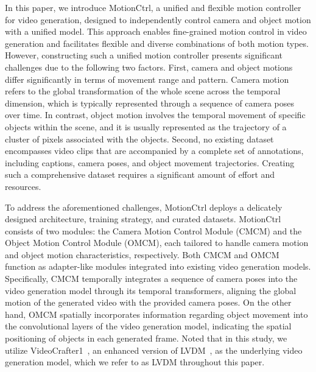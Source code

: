 \documentclass[sigconf]{acmart}
\begin{document}
In this paper, we introduce MotionCtrl, a unified and flexible motion controller for video generation, designed to independently control camera and object motion with a unified model. This approach enables fine-grained motion control in video generation and facilitates flexible and diverse combinations of both motion types.
%
However, constructing such a unified motion controller presents significant challenges due to the following two factors. First, camera and object motions differ significantly in terms of movement range and pattern. Camera motion refers to the global transformation of the whole scene across the temporal dimension, which is typically represented through a sequence of camera poses over time. In contrast, object motion involves the temporal movement of specific objects within the scene, and it is usually represented as the trajectory of a cluster of pixels associated with the objects. Second, no existing dataset encompasses video clips that are accompanied by a complete set of annotations, including captions, camera poses, and object movement trajectories. Creating such a comprehensive dataset requires a significant amount of effort and resources.

To address the aforementioned challenges, MotionCtrl deploys a delicately designed architecture, training strategy, and curated datasets. MotionCtrl consists of two modules: the Camera Motion Control Module (CMCM) and the Object Motion Control Module (OMCM), each tailored to handle camera motion and object motion characteristics, respectively. Both CMCM and OMCM function as adapter-like modules integrated into existing video generation models. Specifically, CMCM temporally integrates a sequence of camera poses into the video generation model through its temporal transformers, aligning the global motion of the generated video with the provided camera poses. On the other hand, OMCM spatially incorporates information regarding object movement into the convolutional layers of the video generation model, indicating the spatial positioning of objects in each generated frame. Noted that in this study, we utilize VideoCrafter1~\cite{chen2023videocrafter1}, an enhanced version of LVDM~\cite{he2022lvdm}, as the underlying video generation model, which we refer to as LVDM throughout this paper.
\end{document}

